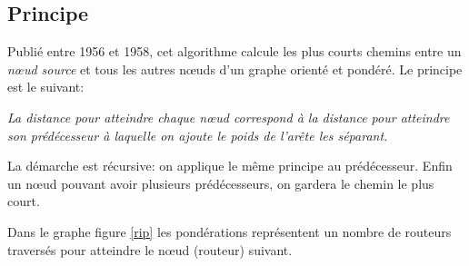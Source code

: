 \documentclass[a4paper,11pt]{article}
\begin{document}
\subsection{Principe}
Publié entre 1956 et 1958, cet algorithme calcule les plus courts chemins entre un \emph{nœud source} et tous les autres nœuds d'un graphe orienté et pondéré. Le principe est le suivant: 
\begin{center}
    \emph{La distance pour atteindre chaque nœud correspond à la distance pour atteindre son prédécesseur à laquelle on ajoute le poids de l'arête les séparant.}
\end{center}
La démarche est récursive: on applique le même principe au prédécesseur. Enfin un nœud pouvant avoir plusieurs prédécesseurs, on gardera le chemin le plus court.
\begin{center}
    \label{rip}
\end{center}
\begin{aretenir}[Remarque]
Dans le graphe figure \ref{rip} les pondérations représentent un nombre de routeurs traversés pour atteindre le nœud (routeur) suivant.
\end{aretenir}
\end{document}
